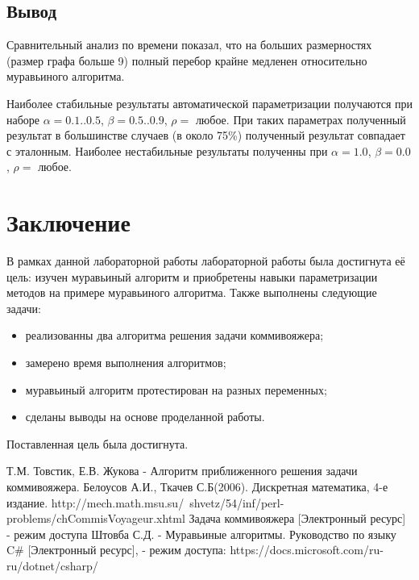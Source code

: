 \documentclass[12pt]{report}
\begin{document}
\section*{Вывод}
Сравнительный анализ по времени показал, что на больших размерностях (размер графа больше 9) полный перебор крайне медленен относительно муравьиного алгоритма.

Наиболее стабильные результаты автоматической параметризации получаются при наборе $\alpha = 0.1..0.5$, $\beta = 0.5..0.9$, $\rho = $ любое. При таких параметрах полученный результат в большинстве случаев (в около 75\%) полученный результат совпадает с эталонным. Наиболее нестабильные результаты полученны при $\alpha = 1.0$, $\beta = 0.0$, $\rho = $ любое.


\chapter*{Заключение}
В рамках данной лабораторной работы лабораторной работы была достигнута её цель: изучен муравьиный алгоритм и приобретены навыки параметризации методов на примере муравьиного алгоритма. Также выполнены следующие задачи:

\begin{itemize}
	\item реализованны два алгоритма решения задачи коммивояжера;
	\item замерено время выполнения алгоритмов;
	\item муравьиный алгоритм протестирован на разных переменных;
	\item сделаны выводы на основе проделанной работы.
\end{itemize}

Поставленная цель была достигнута.

\newpage
{}
\renewcommand\bibname{Список литературы}
 \begin{thebibliography}{3}
 	 Т.М. Товстик, Е.В. Жукова - Алгоритм приближенного решения задачи коммивояжера.
 	 Белоусов А.И., Ткачев С.Б(2006). Дискретная математика, 4-е издание.
 	http://mech.math.msu.su/~shvetz/54/inf/perl-problems/chCommisVoyageur.xhtml
 	 Задача коммивояжера [Электронный ресурс] - режим доступа
 	 Штовба С.Д. - Муравьиные алгоритмы.
	 Руководство по языку C\# [Электронный ресурс], - режим доступа: https://docs.microsoft.com/ru-ru/dotnet/csharp/
\end{thebibliography}
\end{document}
